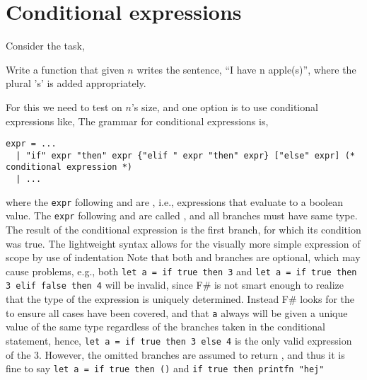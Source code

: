 \section{Conditional expressions}
Consider the task,
\begin{problem}
  Write a function that given $n$ writes the sentence, ``I have n apple(s)'', where the plural 's' is added appropriately.
\end{problem}
For this we need to test on $n$'s size, and one option is to use conditional expressions like,
%
%
The grammar for conditional expressions is,
\begin{lstlisting}[language=ebnf]
expr = ... 
  | "if" expr "then" expr {"elif " expr "then" expr} ["else" expr] (*  conditional expression *)
  | ...
\end{lstlisting}
where the \lstinline[language=ebnf]!expr! following  and  are , i.e., expressions that evaluate to a boolean value. The \lstinline[language=ebnf]!expr! following  and  are called , and all branches must have same type. The result of the conditional expression is the first branch, for which its condition was true. The lightweight syntax allows for the visually more simple expression of scope by use of indentation
%
%
Note that both  and  branches are optional, which may cause problems, e.g., both \lstinline!let a = if true then 3! and \lstinline!let a = if true then 3 elif false then 4!  will be invalid, since F\# is not smart enough to realize that the type of the expression is uniquely determined. Instead F\# looks for the  to ensure all cases have been covered, and that \lstinline!a! always will be given a unique value of the same type regardless of the branches taken in the conditional statement, hence, \lstinline!let a = if true then 3 else 4!  is the only valid expression of the 3. However, the omitted branches are assumed to return \lexeme{()}, and thus it is fine to say \lstinline!let a = if true then ()! and \lstinline!if true then printfn "hej"!

